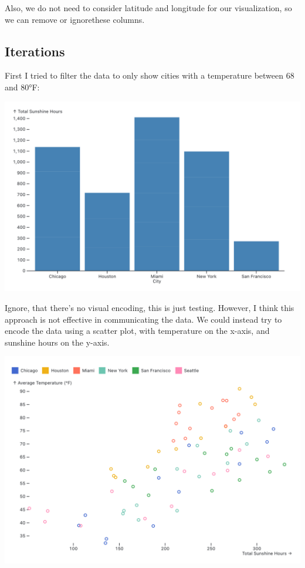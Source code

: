 \documentclass{article}
\begin{document}
Also, we do not need to consider latitude and longitude for our visualization, so we can remove or ignorethese columns.

\pagebreak

\subsection{Iterations}
First I tried to filter the data to only show cities with a temperature between 68 and 80°F: 

\begin{center}
    \includegraphics[width=\textwidth]{filter.png}
\end{center}

Ignore, that there's no visual encoding, this is just testing. However, I think this approach is not effective
in communicating the data. We could instead try to encode the data using a scatter plot, with temperature on the x-axis, and sunshine hours on the y-axis.

\begin{center}
    \includegraphics[scale=0.2]{scatter.png}
\end{center}
\end{document}
